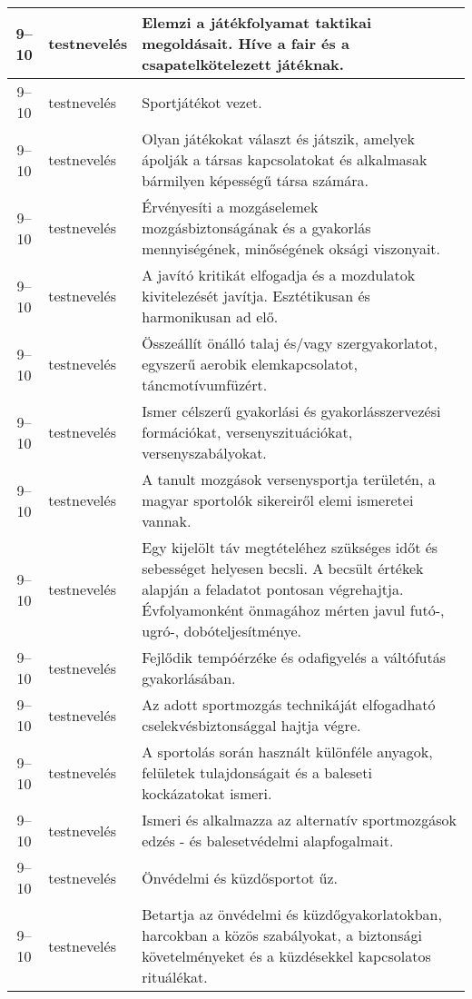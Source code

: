\begin{small}
\begin{longtable}{c | p{2cm} |  p{11cm} }
              9--10 & testnevelés & Elemzi a játékfolyamat taktikai megoldásait. Híve a fair és a csapatelkötelezett játéknak. \\ \hline
              9--10 & testnevelés & Sportjátékot vezet. \\ \hline
              9--10 & testnevelés & Olyan játékokat választ és játszik, amelyek ápolják a társas kapcsolatokat és alkalmasak bármilyen képességű társa számára. \\ \hline
              9--10 & testnevelés & Érvényesíti a mozgáselemek mozgásbiztonságának és a gyakorlás mennyiségének, minőségének oksági viszonyait. \\ \hline
              9--10 & testnevelés & A javító kritikát elfogadja és a mozdulatok kivitelezését javítja. Esztétikusan és harmonikusan ad elő. \\ \hline
              9--10 & testnevelés & Összeállít önálló talaj és/vagy szergyakorlatot, egyszerű aerobik elemkapcsolatot, táncmotívumfüzért. \\ \hline
              9--10 & testnevelés & Ismer célszerű gyakorlási és gyakorlásszervezési formációkat, versenyszituációkat, versenyszabályokat. \\ \hline
              9--10 & testnevelés & A tanult mozgások versenysportja területén, a magyar sportolók sikereiről elemi ismeretei vannak. \\ \hline
              9--10 & testnevelés & Egy kijelölt táv megtételéhez szükséges időt és sebességet helyesen becsli. A becsült értékek alapján a feladatot pontosan végrehajtja. Évfolyamonként önmagához mérten javul futó-, ugró-, dobóteljesítménye. \\ \hline
              9--10 & testnevelés & Fejlődik tempóérzéke és odafigyelés a váltófutás gyakorlásában. \\ \hline
              9--10 & testnevelés & Az adott sportmozgás technikáját elfogadható cselekvésbiztonsággal hajtja végre. \\ \hline
              9--10 & testnevelés & A sportolás során használt különféle anyagok, felületek tulajdonságait és a baleseti kockázatokat ismeri. \\ \hline
              9--10 & testnevelés & Ismeri és alkalmazza az alternatív sportmozgások edzés - és balesetvédelmi alapfogalmait. \\ \hline
              9--10 & testnevelés & Önvédelmi és küzdősportot űz. \\ \hline
              9--10 & testnevelés & Betartja az önvédelmi és küzdőgyakorlatokban, harcokban a közös szabályokat, a biztonsági követelményeket és a küzdésekkel kapcsolatos rituálékat. \\ \hline

\end{longtable}
\end{small}
